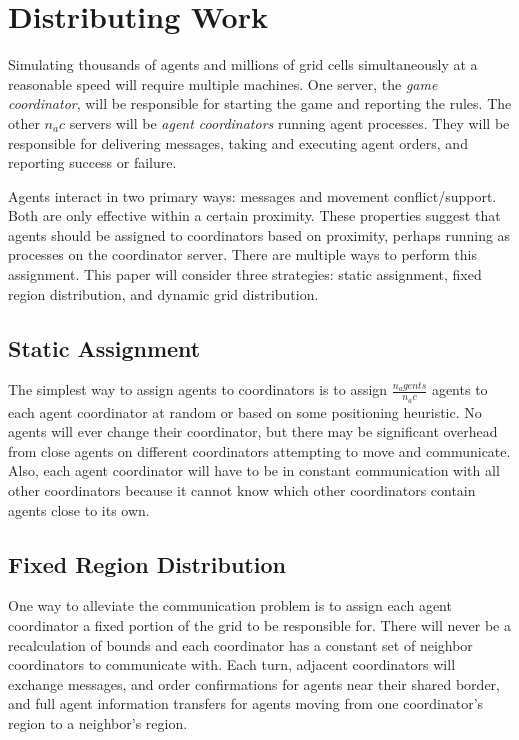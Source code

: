 \section{Distributing Work}

Simulating thousands of agents and millions of grid cells simultaneously at a reasonable speed will require multiple machines. One server, the \emph{game coordinator}, will be responsible for starting the game and reporting the rules. The other $n_ac$ servers will be \emph{agent coordinators} running agent processes. They will be responsible for delivering messages, taking and executing agent orders, and reporting success or failure.

Agents interact in two primary ways: messages and movement conflict/support. Both are only effective within a certain proximity. These properties suggest that agents should be assigned to coordinators based on proximity, perhaps running as processes on the coordinator server. There are multiple ways to perform this assignment. This paper will consider three strategies: static assignment, fixed region distribution, and dynamic grid distribution.

\subsection{Static Assignment}

The simplest way to assign agents to coordinators is to assign $\frac{n_agents}{n_ac}$ agents to each agent coordinator at random or based on some positioning heuristic. No agents will ever change their coordinator, but there may be significant overhead from close agents on different coordinators attempting to move and communicate. Also, each agent coordinator will have to be in constant communication with all other coordinators because it cannot know which other coordinators contain agents close to its own.

\subsection{Fixed Region Distribution}

One way to alleviate the communication problem is to assign each agent coordinator a fixed portion of the grid to be responsible for. There will never be a recalculation of bounds and each coordinator has a constant set of neighbor coordinators to communicate with. Each turn, adjacent coordinators will exchange messages, and order confirmations for agents near their shared border, and full agent information transfers for agents moving from one coordinator's region to a neighbor's region.

